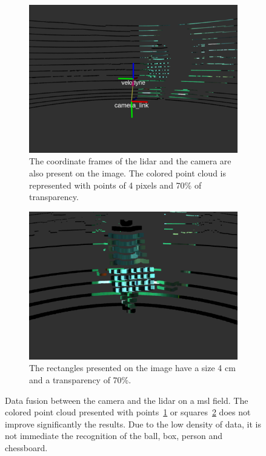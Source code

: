 \begin{figure}[H]
	\centering
	\begin{subfigure}[c]{0.45\textwidth}
		\includegraphics[width=\textwidth]{img/sensor_fusion/cambada_fusion_points.png}
		\caption{The coordinate frames of the \ac{lidar} and the camera are also present on the image. The colored point cloud is represented with points of 4 pixels and 70\% of transparency.}
		\label{fig:sensor-fusion:cambada-points}
	\end{subfigure}
	\qquad
	\begin{subfigure}[c]{0.45\textwidth}
		\includegraphics[width=\textwidth]{img/sensor_fusion/cambada_fusion_squares.png}
		\caption{The rectangles presented on the image have a size 4 cm and a transparency of 70\%.}
		\label{fig:sensor-fusion:cambada-squares}
	\end{subfigure}
\caption{Data fusion between the camera and the \ac{lidar} on a \ac{msl} field. The colored point cloud presented with points~\ref{fig:sensor-fusion:cambada-points} or squares~\ref{fig:sensor-fusion:cambada-squares} does not improve significantly the results. Due to the low density of data, it is not immediate the recognition of the ball, box, person and chessboard.}
	\label{fig:cambada-sensor-fusion}
\end{figure}


